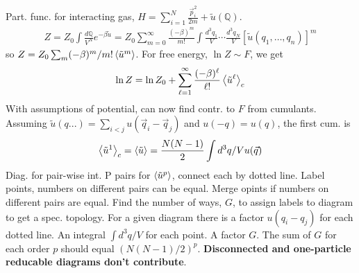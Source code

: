 \documentclass[a4paper, english, 12pt]{article}
\begin{document}
\begin{multicols*}{2}
Part. func. for interacting gas, $H=\sum_{i=1}^N \frac{\vec{p}_i^2}{2m}+\tilde{u}(\mathbb{Q})$. 
\begin{align*}
    Z = Z_0 \int \frac{d \mathbb{Q}}{V^N} e^{-\beta\tilde{u}} = Z_0 \sum_{m=0}^\infty \frac{(-\beta)^m}{m!} \int \frac{d^3 q_1}{V}\cdots \frac{d^3 q_N}{V}[\tilde{u}(q_1,\dots,q_n)]^m
\end{align*}
so $Z=Z_0 \sum_m (-\beta)^m/m! \expval{\tilde{u}^m}$. For free energy, $\ln Z\sim F$, we get 
\begin{align*}
    \ln Z = \ln Z_0 + \sum_{\ell=1}^\infty \frac{(-\beta)^\ell}{\ell!} \expval{\tilde{u}^\ell}_c
\end{align*}
With assumptions of potential, can now find contr. to $F$ from cumulants. Assuming $\tilde{u}(q...)=\sum_{i<j}u(\vec{q}_i-\vec{q}_j)$ and $u(-q)=u(q)$, the first cum. is 
\begin{align*}
    \expval{\tilde{u}^1}_c = \expval{\tilde{u}}=\frac{N(N-1)}{2}\int d^3 q/V u(\vec{q})
\end{align*}
Diag. for pair-wise int. P pairs for $\expval{\tilde{u}^p}$, connect each by dotted line. Label points, numbers on different pairs can be equal. Merge opints if numbers on different pairs are equal. Find the number of ways, $G$, to assign labels to diagram to get a spec. topology. For a given diagram there is a factor $u(q_i-q_j)$ for each dotted line. An integral $\int d^3 q/V$ for each point. A factor $G$. The sum of $G$ for each order $p$ should equal $(N(N-1)/2)^p$. \textbf{Disconnected and one-particle reducable diagrams don't contribute}. 


\end{multicols*}
\end{document}
